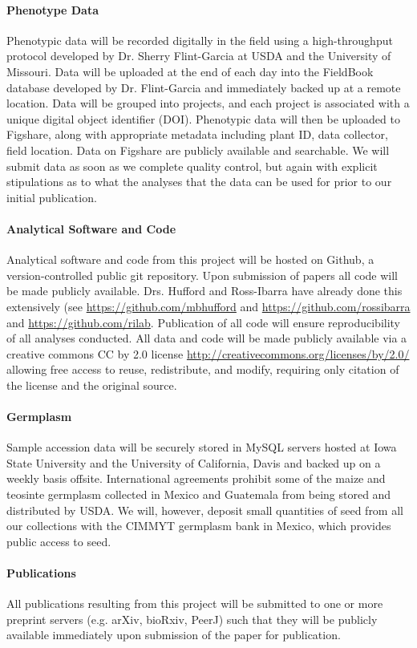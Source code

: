 \paragraph{Phenotype Data} 
Phenotypic data will be recorded digitally in the field using a high-throughput protocol developed by Dr. Sherry Flint-Garcia at USDA and the University of Missouri.  Data will be uploaded at the end of each day into the FieldBook database developed by Dr. Flint-Garcia and immediately backed up at a remote location. Data will be grouped into projects, and each project is associated with a unique digital object identifier (DOI).  Phenotypic data will then be uploaded to Figshare, along with appropriate metadata including plant ID, data collector, field location. 
Data on Figshare are publicly available and searchable.  We will submit data as soon as we complete quality control, but again with explicit stipulations as to what the analyses that the data can be used for prior to our initial publication. 

\paragraph{Analytical Software and Code} 
Analytical software and code from this project will be hosted on Github, a version-controlled public git repository.  Upon submission of papers all code will be made publicly available.  Drs. Hufford and Ross-Ibarra have already done this extensively (see \url{https://github.com/mbhufford} and \url{https://github.com/rossibarra} and \url{https://github.com/rilab}. Publication of all code will ensure reproducibility of all analyses conducted.  All data and code will be made publicly available via a creative commons CC by 2.0 license \url{http://creativecommons.org/licenses/by/2.0/} allowing free access to reuse, redistribute, and modify, requiring only citation of the license and the original source.

\paragraph{Germplasm} 
Sample accession data will be securely stored in MySQL servers hosted at Iowa State University and the University of California, Davis and backed up on a weekly basis offsite.  International agreements prohibit some of the maize and teosinte germplasm collected in Mexico and Guatemala from being stored and distributed by USDA.  We will, however, deposit small quantities of seed from all our collections with the CIMMYT germplasm bank in Mexico, which provides public access to seed.

\paragraph{Publications} 
All publications resulting from this project will be submitted to one or more preprint servers (e.g. arXiv, bioRxiv, PeerJ) such that they will be publicly available immediately upon submission of the paper for publication.